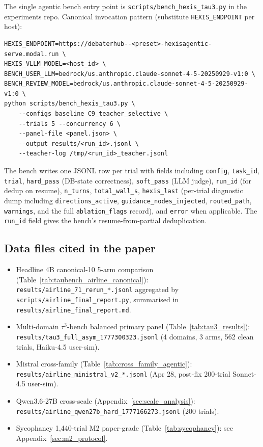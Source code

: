 The single agentic bench entry point is \texttt{scripts/bench\_hexis\_tau3.py} in the experiments repo. Canonical invocation pattern (substitute \texttt{HEXIS\_ENDPOINT} per host):

\begin{verbatim}
HEXIS_ENDPOINT=https://debaterhub--<preset>-hexisagentic-serve.modal.run \
HEXIS_VLLM_MODEL=<host_id> \
BENCH_USER_LLM=bedrock/us.anthropic.claude-sonnet-4-5-20250929-v1:0 \
BENCH_REVIEW_MODEL=bedrock/us.anthropic.claude-sonnet-4-5-20250929-v1:0 \
python scripts/bench_hexis_tau3.py \
    --configs baseline C9_teacher_selective \
    --trials 5 --concurrency 6 \
    --panel-file <panel.json> \
    --output results/<run_id>.jsonl \
    --teacher-log /tmp/<run_id>_teacher.jsonl
\end{verbatim}

The bench writes one JSONL row per trial with fields including \texttt{config}, \texttt{task\_id}, \texttt{trial}, \texttt{hard\_pass} (DB-state correctness), \texttt{soft\_pass} (LLM judge), \texttt{run\_id} (for dedup on resume), \texttt{n\_turns}, \texttt{total\_wall\_s}, \texttt{hexis\_last} (per-trial diagnostic dump including \texttt{directions\_active}, \texttt{guidance\_nodes\_injected}, \texttt{routed\_path}, \texttt{warnings}, and the full \texttt{ablation\_flags} record), and \texttt{error} when applicable. The \texttt{run\_id} field gives the bench's resume-from-partial deduplication.

\subsection{Data files cited in the paper}

\begin{itemize}[leftmargin=*]
\item Headline 4B canonical-10 5-arm comparison (Table~\ref{tab:taubench_airline_canonical}): \texttt{results/airline\_71\_rerun\_*.jsonl} aggregated by \texttt{scripts/airline\_final\_report.py}, summarised in \texttt{results/airline\_final\_report.md}.
\item Multi-domain $\tau^3$-bench balanced primary panel (Table~\ref{tab:tau3_results}): \texttt{results/tau3\_full\_asym\_1777300323.jsonl} (4 domains, 3 arms, 562 clean trials, Haiku-4.5 user-sim).
\item Mistral cross-family (Table~\ref{tab:cross_family_agentic}): \texttt{results/airline\_ministral\_v2\_*.jsonl} (Apr 28, post-fix 200-trial Sonnet-4.5 user-sim).
\item Qwen3.6-27B cross-scale (Appendix~\ref{sec:scale_analysis}): \texttt{results/airline\_qwen27b\_hard\_1777166273.jsonl} (200 trials).
\item Sycophancy 1,440-trial M2 paper-grade (Table~\ref{tab:sycophancy}): see Appendix~\ref{sec:m2_protocol}.
\end{itemize}

